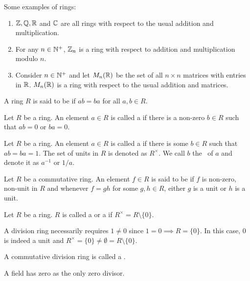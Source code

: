 \begin{ex}
Some examples of rings:
\begin{enumerate}
    \item $\mathbb{Z}, \mathbb{Q}, \mathbb{R}$ and $\mathbb{C}$ are all rings with respect to the usual addition and multiplication.
    \item For any $n \in \mathbb{N}^+$, $\mathbb{Z}_n$ is a ring with respect to addition and multiplication modulo $n$.
    \item Consider $n \in \mathbb{N}^+$ and let $M_n(\mathbb{R})$ be the set of all $n \times n$ matrices with entries in $\mathbb{R}$. $M_n(\mathbb{R})$ is a ring with respect to the usual addition and matrices.
\end{enumerate}
\end{ex}

\begin{defn}
    A ring $R$ is said to be  if $ab = ba$ for all $a,b \in R$.
\end{defn}
\begin{defn}
    Let $R$ be a ring. An element $a \in R$ is called a  if there is a non-zero $b \in R$ such that $ab = 0$ or $ba = 0$.
\end{defn}
\begin{defn}[Unit]
    Let $R$ be a ring. An element $a \in R$ is called a  if there is some $b \in R$ such that $ab = ba = 1$. The set of units in $R$ is denoted as $R^{\times}$. We call $b$ the\footnotemark\  of $a$ and denote it as $a^{-1}$ or $1/a$. 
\end{defn}

\begin{defn}
    Let $R$ be a commutative ring. An element $f \in R$ is said to be  if $f$ is non-zero, non-unit in $R$ and whenever $f = gh$ for some $g,h \in R$, either $g$ is a unit or $h$ is a unit.
\end{defn}
\begin{defn}
    Let $R$ be a ring. $R$ is called a  or a  if $R^{\times} = R\setminus\{0\}$.
\end{defn}
\begin{rem}
A division ring necessarily requires $1 \neq 0$ since $1 = 0 \implies R = \{0\}$. In this case, $0$ is indeed a unit and $R^{\times} = \{0\} \neq \emptyset = R\setminus\{0\}$.
\end{rem}
\begin{defn}[Field]
    A commutative division ring is called a .
\end{defn}
\begin{prop} \label{prop:field-has-zero-as-only-zero-divisor}
    A field has zero as the only zero divisor.
\end{prop}

